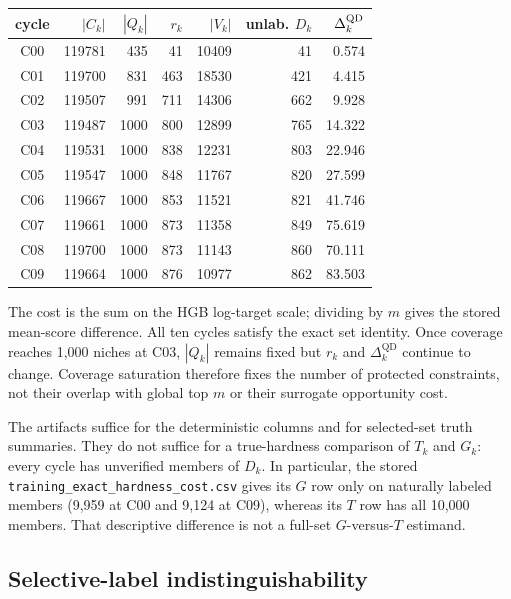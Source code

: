 \begin{center}
\small
\begin{tabular}{crrrrrr}
\toprule
cycle & $|C_k|$ & $|Q_k|$ & $r_k$ & $|V_k|$ & unlab. $D_k$ & $\Delta_k^{\rm QD}$\\
\midrule
C00 & 119781 & 435  & 41  & 10409 & 41  & 0.574\\
C01 & 119700 & 831  & 463 & 18530 & 421 & 4.415\\
C02 & 119507 & 991  & 711 & 14306 & 662 & 9.928\\
C03 & 119487 & 1000 & 800 & 12899 & 765 & 14.322\\
C04 & 119531 & 1000 & 838 & 12231 & 803 & 22.946\\
C05 & 119547 & 1000 & 848 & 11767 & 820 & 27.599\\
C06 & 119667 & 1000 & 853 & 11521 & 821 & 41.746\\
C07 & 119661 & 1000 & 873 & 11358 & 849 & 75.619\\
C08 & 119700 & 1000 & 873 & 11143 & 860 & 70.111\\
C09 & 119664 & 1000 & 876 & 10977 & 862 & 83.503\\
\bottomrule
\end{tabular}
\end{center}

The cost is the sum on the HGB log-target scale; dividing by $m$ gives the
stored mean-score difference.  All ten cycles satisfy the exact set identity.
Once coverage reaches 1,000 niches at C03, $|Q_k|$ remains fixed but $r_k$ and
$\Delta_k^{\mathrm{QD}}$ continue to change.  Coverage saturation therefore
fixes the number of protected constraints, not their overlap with global top
$m$ or their surrogate opportunity cost.

The artifacts suffice for the deterministic columns and for selected-set
truth summaries.  They do not suffice for a true-hardness comparison of $T_k$
and $G_k$: every cycle has unverified members of $D_k$.  In particular, the
stored \texttt{training\_exact\_hardness\_cost.csv} gives its $G$ row only on
naturally labeled members (9,959 at C00 and 9,124 at C09), whereas its $T$ row
has all 10,000 members.  That descriptive difference is not a full-set
$G$-versus-$T$ estimand.

\subsection{Selective-label indistinguishability}

\par
{}\par
{}\par

